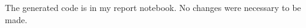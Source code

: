 \documentclass[8pt,a4paper]{report}%
\begin{document}
The generated code is in my report notebook. No changes were necessary to be made.



    
\end{document}

